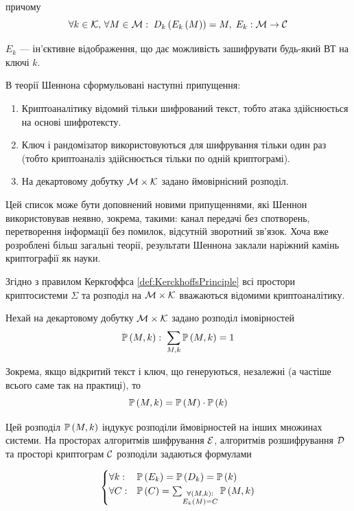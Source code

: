 причому
$$\forall k \in \mathcal{K},\, \forall M \in \mathcal{M}:\;
    D_k\left( E_k\left( M \right) \right) = M,\;
    E_k: \mathcal{M} \rightarrow \mathcal{C}$$

$E_k$ --- ін'єктивне відображення, що дає можливість зашифрувати будь-який ВТ на
ключі $k$.

В теорії Шеннона сформульовані наступні припущення:
\begin{enumerate}
    \item Криптоаналітику відомий тільки шифрований текст, тобто атака
        здійснюється на основі шифротексту.
    \item Ключ і рандомізатор використовуються для шифрування тільки один раз
        (тобто криптоаналіз здійснюється тільки по одній криптограмі). 
    \item На  декартовому добутку $\mathcal{M} \times \mathcal{K}$ задано
        ймовірнісний розподіл.
\end{enumerate}

Цей список може бути доповнений новими припущеннями, які Шеннон використовував
неявно, зокрема, такими: канал передачі без спотворень, перетворення
інформації без помилок, відсутній зворотний зв’язок. Хоча вже розроблені більш
загальні теорії, результати Шеннона заклали наріжний камінь криптографії як
науки.

Згідно з правилом Керкгоффса \eqref{def:KerckhoffsPrinciple} всі простори
криптосистеми $\Sigma$ та розподіл на $\mathcal{M} \times \mathcal{K}$ вважаються
відомими криптоаналітику.

Нехай на декартовому добутку $\mathcal{M} \times \mathcal{K}$ задано розподіл
імовірностей 
$$\mathbb{P}\left( M, k \right):\; \sum_{M, k} \mathbb{P}\left( M, k \right) = 1$$

Зокрема, якщо відкритий текст і ключ, що генеруються, незалежні (а частіше
всього саме так на практиці), то
$$\mathbb{P}\left( M, k \right) = \mathbb{P}\left( M \right) \cdot \mathbb{P}\left( k \right)$$

Цей розподіл $\mathbb{P}\left( M, k \right)$  індукує розподіли ймовірностей на інших
множинах системи. На просторах алгоритмів шифрування $\mathcal{E}$,
алгоритмів розшифрування $\mathcal{D}$ та просторі криптограм
$\mathcal{C}$ розподіли задаються формулами

\begin{equation}\label{eq:probabilitiesEA}
    \begin{cases}
        \forall k: &\mathbb{P}\left( E_k \right) = \mathbb{P}\left( D_k \right) = \mathbb{P}\left( k \right) \\
        \forall C: &\mathbb{P}\left( C \right)
            = \sum_{\substack{\forall \left( M, k \right):\\
                    E_k\left( M \right) = C}}
                \mathbb{P}\left( M, k \right)
    \end{cases}
\end{equation}

